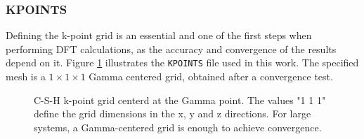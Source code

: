 \subsubsection{KPOINTS}
Defining the k-point grid is an essential and one of the first steps when performing DFT calculations, as the accuracy and convergence of the results depend on it. Figure \ref{kpoints} illustrates the \texttt{KPOINTS} file used in this work. The specified mesh is a $1\times 1\times 1$ Gamma centered grid, obtained after a convergence test. 
\begin{figure}[H]
	\centering
	\caption{C-S-H k-point grid centerd at the Gamma point. The values "1 1 1" define the grid dimensions in the x, y and z directions. For large systems, a Gamma-centered grid is enough to achieve convergence.}
	\label{kpoints}
\end{figure}

